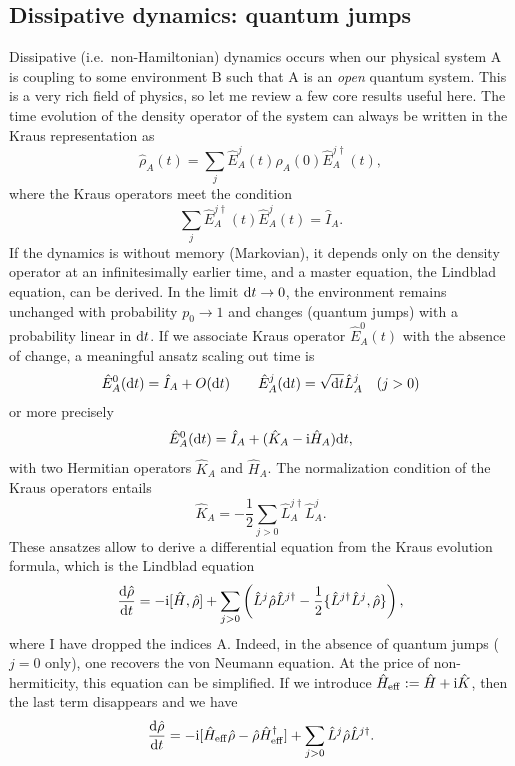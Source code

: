 \documentclass[a4paper,10pt,oneside,onecolumn,1p,times]{elsarticle}
\newcommand{\diff}{{\rm d}}
\newcommand{\imag}{{\rm i }}
\begin{document}
\subsection{Dissipative dynamics: quantum jumps}
Dissipative (i.e.\ non-Hamiltonian) dynamics occurs when our physical system A is coupling to some environment B such that A is an {\em open} quantum system. This is a very rich field of physics, so let me review a few core results useful here. The time evolution of the density operator of the system can always be written in the Kraus representation as
\begin{equation}
\hat{\rho}_A (t) = \sum_j \hat{E}_A^j(t) \hat{\rho}_A (0) \hat{E}_A^{j\dagger}(t),
\end{equation}
where the Kraus operators meet the condition 
\begin{equation}
\sum_j \hat{E}_A^{j\dagger}(t) \hat{E}_A^j(t) = \hat{I}_A .
\end{equation}
If the dynamics is without memory (Markovian), it depends only on the density operator at an infinitesimally earlier time, and a master equation, the Lindblad equation, can be derived. In the limit $\diff t\rightarrow 0$, the environment remains unchanged with probability $p_0 \rightarrow 1$ and changes (quantum jumps) with a probability linear in $\diff t$. If we associate Kraus operator $\hat{E}_A^0(t)$ with the absence of change, a meaningful ansatz scaling out time is
\begin{equation}
\hat{E}_A^0(\diff t) = \hat{I}_A + O(\diff t) \quad\quad \hat{E}_A^j(\diff t) = \sqrt{\diff t} \hat{L}_A^j  \quad (j>0)
\end{equation}
or more precisely
\begin{equation}
\hat{E}_A^0(\diff t) = \hat{I}_A + (\hat{K}_A - \imag \hat{H}_A) \diff t ,
\end{equation}
with two Hermitian operators $\hat{K}_A$ and $\hat{H}_A$. The normalization condition of the Kraus operators entails 
\begin{equation}
\hat{K}_A = -\frac{1}{2} \sum_{j>0} \hat{L}_A^{j\dagger} \hat{L}_A^j .
\end{equation}
These ansatzes allow to derive a differential equation from the Kraus evolution formula, which is the Lindblad equation
\begin{equation}
\frac{\diff \hat{\rho}}{\diff t} = - \imag [\hat{H},\hat{\rho}] + \sum_{j>0} \left( \hat{L}^j \hat{\rho} \hat{L}^{j\dagger} - \frac{1}{2} \{ \hat{L}^{j\dagger} \hat{L}^j, \hat{\rho} \} \right) ,
\end{equation} 
where I have dropped the indices A. Indeed, in the absence of  quantum jumps ($j=0$ only), one recovers the von Neumann equation. At the price of non-hermiticity, this equation can be simplified. If we introduce $\hat{H}_{{\rm eff}} := \hat{H} + \imag \hat{K}$, then the last term disappears and we have
\begin{equation}
\frac{\diff \hat{\rho}}{\diff t} = - \imag [\hat{H}_{{\rm eff}}\hat{\rho}-\hat{\rho}\hat{H}_{{\rm eff}}^\dagger] + \sum_{j>0} \hat{L}^j \hat{\rho} \hat{L}^{j\dagger} .
\label{eq:Lindblad2}
\end{equation} 
\end{document}
